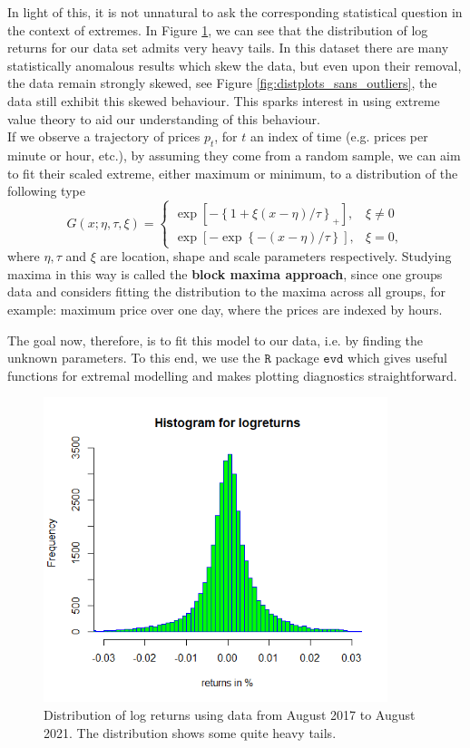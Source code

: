 \documentclass[twoside]{report}
\newcommand{\code}{\texttt}
\begin{document}
\begin{spacing}{1}
In light of this, it is not unnatural to ask the corresponding statistical question in the context of extremes. In Figure \ref{fig:hist_logreturn_17_21}, we can see that the distribution of log returns for our data set admits very heavy tails. In this dataset there are many statistically anomalous results which skew the data, but even upon their removal, the data remain strongly skewed, see Figure \ref{fig:distplots_sans_outliers}, the data still exhibit this skewed behaviour. This sparks interest in using extreme value theory to aid our understanding of this behaviour.\\

If we observe a trajectory of prices $p_t$, for $t$ an index of time (e.g. prices per minute or hour, etc.), by assuming they come from a random sample, we can aim to fit their scaled extreme, either maximum or minimum, to a distribution of the following type \[
G(x; \eta, \tau, \xi) = \begin{cases}
\exp\left[-\left\{1+\xi(x-\eta)/\tau\right\}_+\right], & \xi \ne 0\\
\exp\left[-\exp\left\{-(x-\eta)/\tau\right\}\right], & \xi = 0,
\end{cases}
\]
where $\eta, \tau$ and $\xi$ are location, shape and scale parameters respectively. Studying maxima in this way is called the \textbf{block maxima approach}, since one groups data and considers fitting the distribution to the maxima across all groups, for example: maximum price over one day, where the prices are indexed by hours.

The goal now, therefore, is to fit this model to our data, i.e. by finding the unknown parameters. To this end, we use the $\code{R}$ package $\code{evd}$ which gives useful functions for extremal modelling and makes plotting diagnostics straightforward. 
\begin{figure}
    \centering
    \includegraphics[width=\linewidth, height=3.5in]{TestPlots/Histogram log-returns2.png}
    \caption{Distribution of log returns using data from August 2017 to August 2021. The distribution shows some quite heavy tails.}
    \label{fig:hist_logreturn_17_21}
\end{figure}


\end{spacing}
\end{document}
